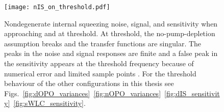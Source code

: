 \begin{figure}
    \centering
    \texttt{[image: nIS\_on\_threshold.pdf]}
    \caption{ Nondegenerate internal squeezing noise, signal, and sensitivity when approaching and at threshold. At threshold, the no-pump-depletion assumption breaks and the transfer functions are singular. The peaks in the noise and signal responses are finite and a false peak in the sensitivity appears at the threshold frequency because of numerical error and limited sample points . For the threshold behaviour of the other configurations in this thesis see Figs.~\ref{fig:dOPO_variances}~\ref{fig:nOPO_variances}~\ref{fig:dIS_sensitivity}~\ref{fig:sWLC_sensitivity}.}
    \label{fig:nIS_on_threshold}
\end{figure}

